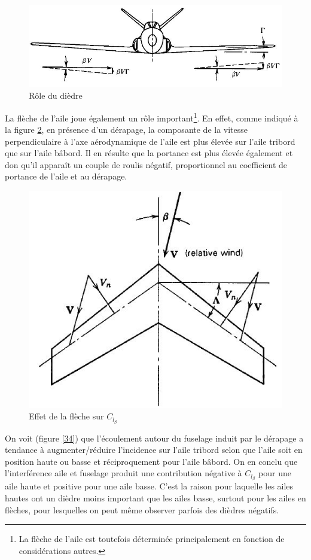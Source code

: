 \documentclass{report}
\begin{document}
\begin{figure}[h!]
    \centering
    \includegraphics[scale=0.7]{32.JPG}
    \caption{Rôle du dièdre}
    \label{32}
\end{figure}

La flèche de l'aile joue également un rôle important\footnote{La flèche de l'aile est toutefois déterminée principalement en fonction de considérations autres.}. En effet, comme indiqué à la figure \ref{33}, en présence d'un dérapage, la composante de la vitesse perpendiculaire à l'axe aérodynamique de l'aile est plus élevée sur l'aile tribord que sur l'aile bâbord. Il en résulte que la portance est plus élevée également et don qu'il apparaît un couple de roulis négatif, proportionnel au coefficient de portance de l'aile et au dérapage.

\begin{figure}[h!]
    \centering
    \includegraphics[scale=0.7]{33.JPG}
    \caption{Effet de la flèche sur $C_{l_\beta}$}
    \label{33}
\end{figure}

On voit (figure \ref{34}) que l'écoulement autour du fuselage induit par le dérapage a tendance à augmenter/réduire l'incidence sur l'aile tribord selon que l'aile soit en position haute ou basse et réciproquement pour l'aile bâbord. On en conclu que l'interférence aile et fuselage produit une contribution négative à $C_{l_\beta}$ pour une aile haute et positive pour une aile basse. C'est la raison pour laquelle les ailes hautes ont un dièdre moins important que les ailes basse, surtout pour les ailes en flèches, pour lesquelles on peut même observer parfois des dièdres négatifs.
\end{document}
